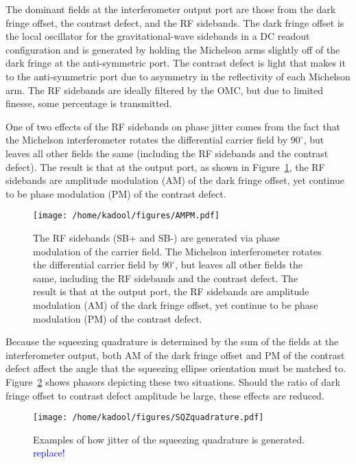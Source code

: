 \documentclass{ligodoc}
\begin{document}
The dominant fields at the interferometer output port are those from
the dark fringe offset, the contrast defect, and the RF sidebands. The
dark fringe offset is the local oscillator for the gravitational-wave
sidebands in a DC readout configuration and is generated by holding
the Michelson arms slightly off of the dark fringe at the
anti-symmetric port. The contrast defect is light that makes it to the
anti-symmetric port due to asymmetry in the reflectivity of each
Michelson arm. The RF sidebands are ideally filtered by the OMC, but
due to limited finesse, some percentage is transmitted.

One of two effects of the RF sidebands on phase jitter comes from the
fact that the Michelson interferometer rotates the differential
carrier field by $90^\circ$, but leaves all other fields the same
(including the RF sidebands and the contrast defect). The result is
that at the output port, as shown in Figure~\ref{fig:AMPM}, the RF
sidebands are amplitude modulation (AM) of the dark fringe offset, yet
continue to be phase modulation (PM) of the contrast defect.

\begin{figure}
\begin{centering}
\texttt{[image: /home/kadool/figures/AMPM.pdf]}
\caption{The RF sidebands (SB+ and SB-) are generated via phase
  modulation of the carrier field. The Michelson interferometer
  rotates the differential carrier field by $90^\circ$, but leaves all
  other fields the same, including the RF sidebands and the contrast
  defect. The result is that at the output port, the RF sidebands are
  amplitude modulation (AM) of the dark fringe offset, yet continue to
  be phase modulation (PM) of the contrast defect.}
\label{fig:AMPM}
\end{centering}
\end{figure}

Because the squeezing quadrature is determined by the sum of the
fields at the interferometer output, both AM of the dark fringe offset
and PM of the contrast defect affect the angle that the squeezing
ellipse orientation must be matched to. Figure~\ref{fig:sqzquad} shows
phasors depicting these two situations. Should the ratio of dark
fringe offset to contrast defect amplitude be large, these effects are
reduced.

\begin{figure}
\begin{centering}
\texttt{[image: /home/kadool/figures/SQZquadrature.pdf]}
\caption{Examples of how jitter of the squeezing quadrature is
  generated. \textcolor{blue}{replace!}}
\label{fig:sqzquad}
\end{centering}
\end{figure}
\end{document}
